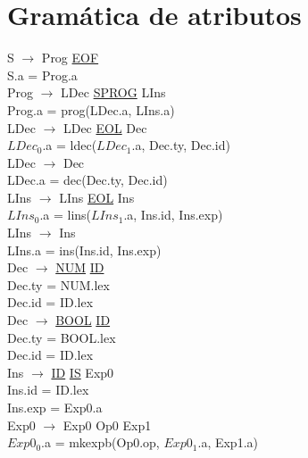 \documentclass[\main/MemoriaPL.tex]{subfiles}
\begin{document}
  \section{Gramática de atributos}
    S $\rightarrow$ Prog \underline{EOF}\\
    \hspace{5mm}S.a = Prog.a\\
    Prog $\rightarrow$ LDec \underline{SPROG} LIns\\
    \hspace{5mm}Prog.a = prog(LDec.a, LIns.a)\\
    LDec $\rightarrow$ LDec \underline{EOL} Dec\\
    \hspace{5mm}$LDec_0$.a = ldec($LDec_1$.a, Dec.ty, Dec.id)\\
    LDec $\rightarrow$ Dec\\
    \hspace{5mm}LDec.a = dec(Dec.ty, Dec.id)\\
    LIns $\rightarrow$ LIns \underline{EOL} Ins\\
    \hspace{5mm}$LIns_0$.a = lins($LIns_1$.a, Ins.id, Ins.exp)\\
    LIns $\rightarrow$ Ins\\
    \hspace{5mm}LIns.a = ins(Ins.id, Ins.exp)\\
    Dec $\rightarrow$ \underline{NUM} \underline{ID}\\
    \hspace{5mm}Dec.ty = NUM.lex\\
    \hspace{5mm}Dec.id = ID.lex\\
    Dec $\rightarrow$ \underline{BOOL} \underline{ID}\\
    \hspace{5mm}Dec.ty = BOOL.lex\\
    \hspace{5mm}Dec.id = ID.lex\\
    Ins $\rightarrow$ \underline{ID} \underline{IS} Exp0\\
    \hspace{5mm}Ins.id = ID.lex\\
    \hspace{5mm}Ins.exp = Exp0.a\\
    Exp0 $\rightarrow$ Exp0 Op0 Exp1\\
    \hspace*{5mm}$Exp0_0$.a = mkexpb(Op0.op, $Exp0_1$.a, Exp1.a)\\
\end{document}

